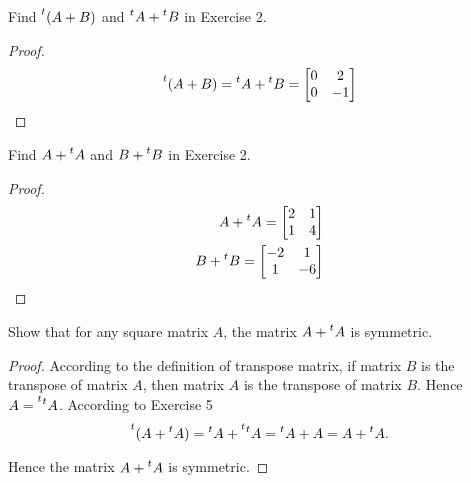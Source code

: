 \begin{exercise}
    Find $\prescript{t}{}{(A + B)}$ and $\prescript{t}{}{A} + \prescript{t}{}{B}$ in Exercise 2.
\end{exercise}

\begin{proof}
    \[
        \prescript{t}{}{(A + B)} = \prescript{t}{}{A} + \prescript{t}{}{B} = \begin{bmatrix}
            0 & 2  \\
            0 & -1
        \end{bmatrix}
    \]
\end{proof}

\begin{exercise}
    Find $A + \prescript{t}{}{A}$ and $B + \prescript{t}{}{B}$ in Exercise 2.
\end{exercise}

\begin{proof}
    \[
        \begin{split}
            A + \prescript{t}{}{A} = \begin{bmatrix}
                2 & 1 \\
                1 & 4
            \end{bmatrix} \\
            B + \prescript{t}{}{B} = \begin{bmatrix}
                -2 & 1  \\
                1  & -6
            \end{bmatrix}
        \end{split}
    \]
\end{proof}

\begin{exercise}
    Show that for any square matrix $A$, the matrix $A + \prescript{t}{}{A}$ is symmetric.
\end{exercise}

\begin{proof}
    According to the definition of transpose matrix, if matrix $B$ is the transpose of matrix $A$, then matrix $A$ is the transpose of matrix $B$. Hence $A = \prescript{t}{}{\prescript{t}{}{A}}$. According to Exercise 5
    \[
        \prescript{t}{}{(A + \prescript{t}{}{A})} = \prescript{t}{}{A} + \prescript{t}{}{\prescript{t}{}{A}} = \prescript{t}{}{A} + A = A + \prescript{t}{}{A}.
    \]

    Hence the matrix $A + \prescript{t}{}{A}$ is symmetric.
\end{proof}

